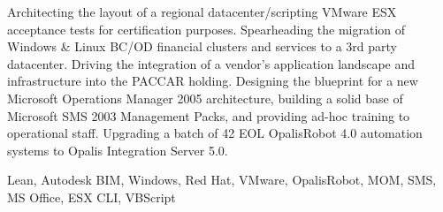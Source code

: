 \begin{experiences}
{\begin{itemize}
                        \linebreak Architecting the layout of a regional datacenter/scripting VMware ESX acceptance tests for certification purposes.
                        \linebreak Spearheading the migration of Windows \& Linux BC/OD financial clusters and services to a 3rd party datacenter.
                        \linebreak Driving the integration of a vendor's application landscape and infrastructure into the PACCAR holding.
                        \linebreak Designing the blueprint for a new Microsoft Operations Manager 2005 architecture, building a solid base of Microsoft SMS 2003 Management Packs, and providing ad-hoc training to operational staff.
                        \linebreak Upgrading a batch of 42 EOL OpalisRobot 4.0 automation systems to Opalis Integration Server 5.0.
                      \end{itemize}
                    }
                    {Lean, Autodesk BIM, Windows, Red Hat, VMware, OpalisRobot, MOM, SMS, MS Office, ESX CLI, VBScript}
\end{experiences}
